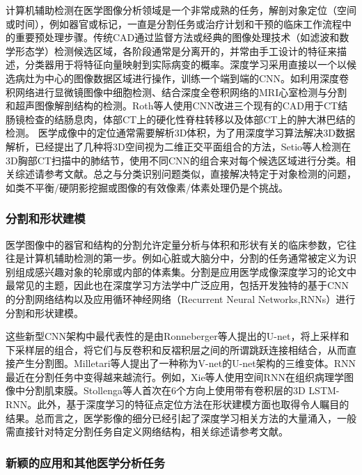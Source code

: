 计算机辅助检测在医学图像分析领域是一个非常成熟的任务，解剖对象定位（空间或时间），例如器官或标记，一直是分割任务或治疗计划和干预的临床工作流程中的重要预处理步骤。传统CAD\citep{Van2011Computer}通过监督方法或经典的图像处理技术（如滤波和数学形态学）检测候选区域，各阶段通常是分离开的，并常由手工设计的特征来描述，分类器用于将特征向量映射到实际病变的概率。深度学习采用直接以一个以候选病灶为中心的图像数据区域进行操作，训练一个端到端的CNN。如利用深度卷积网络进行显微镜图像中细胞检测\citep{Akram2016}、结合深度全卷积网络的MRI心室检测与分割\citep{Emad2015,Tran2016a}和超声图像解剖结构的检测\citep{Chen2016i}。Roth等人\citep{Roth2016}使用CNN改进三个现有的CAD用于CT结肠镜检查的结肠息肉，体部CT上的硬化性脊柱转移以及体部CT上的肿大淋巴结的检测。
医学成像中的定位通常需要解析3D体积，为了用深度学习算法解决3D数据解析，已经提出了几种将3D空间视为二维正交平面组合的方法，Setio等人\citep{Setio2016Pulmonary}检测在3D胸部CT扫描中的肺结节，使用不同CNN的组合来对每个候选区域进行分类。相关综述请参考文献\citep{Shin2016}。总之与分类识别问题类似，直接解决特定于对象检测的问题，如类不平衡/硬阴影挖掘或图像的有效像素/体素处理仍是个挑战。

\subsubsection{分割和形状建模}

医学图像中的器官和结构的分割允许定量分析与体积和形状有关的临床参数，它往往是计算机辅助检测的第一步。例如心脏或大脑分中，分割的任务通常被定义为识别组成感兴趣对象的轮廓或内部的体素集。分割是应用医学成像深度学习的论文中最常见的主题，因此也在深度学习方法学中广泛应用，包括开发独特的基于CNN的分割网络结构以及应用循环神经网络（Recurrent Neural Networks,RNNs）进行分割和形状建模。

这些新型CNN架构中最代表性的是由Ronneberger等人\citep{Ronneberger2015}提出的U-net，将上采样和下采样层的组合，将它们与反卷积和反褶积层之间的所谓跳跃连接相结合，从而直接产生分割图。Milletari等人\citep{Milletari2016}提出了一种称为V-net的U-net架构的三维变体。RNN最近在分割任务中变得越来越流行。例如，Xie等人\citep{xie2016}使用空间RNN在组织病理学图像中分割肌束膜。Stollenga等人\citep{cortes2015}首次在6个方向上使用带有卷积层的3D LSTM-RNN。此外，基于深度学习的特征点定位方法\citep{Trigeorgis2016}在形状建模方面也取得令人瞩目的结果。总而言之，医学影像的细分已经引起了深度学习相关方法的大量涌入，一般需直接针对特定分割任务自定义网络结构，相关综述请参考文献。

\subsubsection{新颖的应用和其他医学分析任务}
\label{sec:applications_various}

